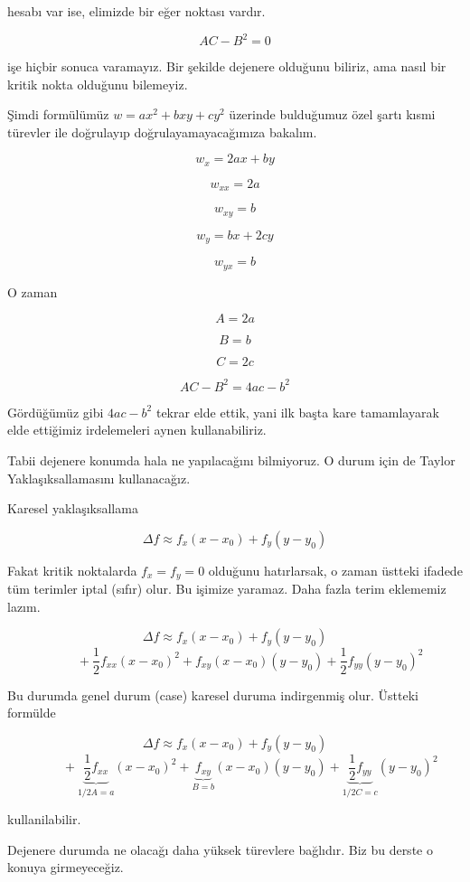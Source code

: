 \documentclass[12pt,fleqn]{article}\usepackage{../../common}
\begin{document}
hesabı var ise, elimizde bir eğer noktası vardır. 

$$ AC - B^2 = 0 $$

işe hiçbir sonuca varamayız. Bir şekilde dejenere olduğunu biliriz, ama
nasıl bir kritik nokta olduğunu bilemeyiz. 

Şimdi formülümüz $w = ax^2 + bxy + cy^2$ üzerinde bulduğumuz özel şartı
kısmi türevler ile doğrulayıp doğrulayamayacağımıza bakalım. 

$$ w_{x} = 2ax + by$$

$$ w_{xx} = 2a$$

$$ w_{xy} = b$$

$$ w_{y} = bx + 2cy $$

$$ w_{yx} = b $$

O zaman

$$ A = 2a $$

$$ B = b $$

$$ C = 2c $$

$$ AC - B^2 = 4ac - b^2 $$

Gördüğümüz gibi $4ac - b^2$ tekrar elde ettik, yani ilk başta kare
tamamlayarak elde ettiğimiz irdelemeleri aynen kullanabiliriz. 

Tabii dejenere konumda hala ne yapılacağını bilmiyoruz. O durum için de
Taylor Yaklaşıksallamasını kullanacağız. 

Karesel yaklaşıksallama

$$ \Delta f \approx f_x (x - x_0) + f_y (y - y_0) $$

Fakat kritik noktalarda $f_x = f_y = 0$ olduğunu hatırlarsak, o zaman
üstteki ifadede tüm terimler iptal (sıfır) olur. Bu işimize yaramaz. Daha
fazla terim eklememiz lazım. 

$$ \Delta f \approx f_x (x - x_0) + f_y (y - y_0)   $$
$$\hspace{1cm}  + 
\frac{1}{2}f_{xx}(x-x_0)^2 + f_{xy}(x-x_0)(y-y_0) + 
\frac{1}{2}f_{yy}(y-y_0)^2 $$

Bu durumda genel durum (case) karesel duruma indirgenmiş olur. Üstteki
formülde 

$$ \Delta f \approx f_x (x - x_0) + f_y (y - y_0)   $$
$$\hspace{1cm} + 
\underbrace{\frac{1}{2}f_{xx}}_{1/2 A = a}(x-x_0)^2 + 
\underbrace{f_{xy}}_{B=b}(x-x_0)(y-y_0) + 
\underbrace{\frac{1}{2}f_{yy}}_{1/2 C = c}(y-y_0)^2 $$

kullanilabilir. 

Dejenere durumda ne olacağı daha yüksek türevlere bağlıdır. Biz bu derste o
konuya girmeyeceğiz. 
\end{document}
